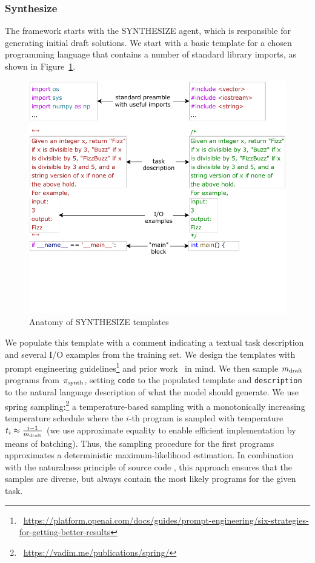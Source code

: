 \subsubsection{Synthesize}
\label{sec:seidr-synth}

The framework starts with the SYNTHESIZE agent, which is responsible for generating initial draft solutions.
We start with a basic template for a chosen programming language that contains a number of standard library imports, as shown in Figure~\ref{fig:template}.

\begin{figure}
    \centering
    \includegraphics[width=0.8\linewidth, trim={0mm 40mm 0mm 0mm}, clip]{images/Templates-new-v2.pdf}
    \caption{Anatomy of SYNTHESIZE templates}
    \label{fig:template}
\end{figure}

We populate this template with a comment indicating a textual task description and several I/O examples from the training set.
We design the templates with prompt engineering guidelines\footnote{~\url{https://platform.openai.com/docs/guides/prompt-engineering/six-strategies-for-getting-better-results}} and prior work~\cite{debruin2021:autoencoders} in mind.
We then sample $m_\text{draft}$ programs from $ \pi_\text{synth} $, setting \texttt{code} to the populated template and \texttt{description} to the natural language description of what the model should generate.
We use spring sampling:\footnote{~\url{https://vadim.me/publications/spring/}} a temperature-based sampling with a monotonically increasing temperature schedule where the $i$-th program is sampled with temperature $t_i \approx \frac{i-1}{m_\text{draft}}$ (we use approximate equality to enable efficient implementation by means of batching).
Thus, the sampling procedure for the first programs approximates a deterministic maximum-likelihood estimation.
In combination with the naturalness principle of source code \cite{allamanis2018:survey,jiang2022:bugs}, this approach ensures that the samples are diverse, but always contain the most likely programs for the given task.

